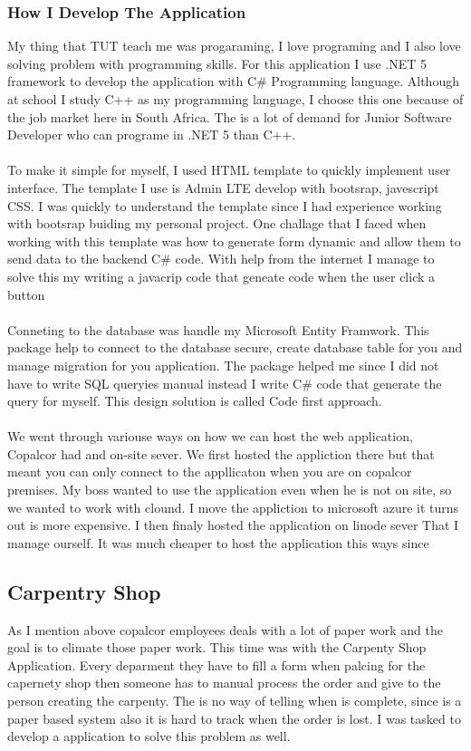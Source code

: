 \documentclass[paper=a4, fontsize=12pt]{scrartcl}
\numberwithin{equation}{section}		%
\numberwithin{figure}{section}			%
\numberwithin{table}{section}				%
\begin{document}
\subsubsection{How I Develop The Application}
My thing that TUT teach me was progaraming, I love programing and I also love
solving problem with programming skills. For this application I use .NET 5
framework to develop the application with C\# Programming language. Although
at school I study C++ as my programming language, I choose this one because
of the job market here in South Africa. The is a lot of demand for Junior
Software Developer who can programe in .NET 5 than C++.
\\
\\
To make it simple for myself, I used HTML template to quickly implement 
user interface. The template I use is Admin LTE develop with bootsrap, javescript
CSS. I was quickly to understand the template since I had experience working
with bootsrap buiding my personal project. One challage that I faced when 
working with this template was how to generate form dynamic and allow them to
send data to the backend C\# code. With help from the internet I manage to 
solve this my writing a javacrip code that geneate code when the user click
a button
\\
\\
Conneting to the database was handle my Microsoft Entity Framwork. This 
package help to connect to the database secure, create database table
for you and manage migration for you application. The package helped me
since I did not have to write SQL queryies manual instead I write 
C\# code that generate the query for myself. This design solution is
called Code first approach. 
\\
\\
We went through variouse ways on how we can host the web application, 
Copalcor had and on-site sever. We first hosted the appliction there but
that meant you can only connect to the appllicaton when you are on copalcor
premises. My boss wanted to use the application even when he is not on site,
so we wanted to work with clound. I move the appliction to microsoft azure it turns
out is more expensive. I then finaly hosted the application on linode sever
That I manage ourself. It was much cheaper to host the application this ways
since 


\subsection{Carpentry Shop}
As I mention above copalcor employees deals with a lot of paper work and 
the goal is to elimate those paper work. This time was with the Carpenty 
Shop Application. Every deparment they have to fill a form when palcing 
for the capernety shop then someone has to manual process the order and
give to the person creating the carpenty. The is no way of telling 
when is complete, since is a paper based system also it is hard to track
when the order is lost. I was tasked to develop a application to solve 
this problem as well. 
\\
\\
\end{document}
